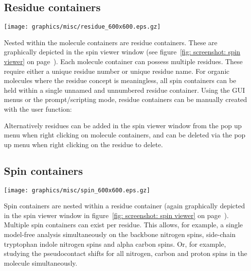 \subsection{Residue containers}

\begin{figure*}[h]
\texttt{[image: graphics/misc/residue\_600x600.eps.gz]}
\end{figure*}

Nested within the molecule containers are residue containers.  These are graphically depicted in the spin viewer window (see figure~\ref{fig: screenshot: spin viewer} on page~\pageref{fig: screenshot: spin viewer}).  Each molecule container can possess multiple residues.  These require either a unique residue number or unique residue name.  For organic molecules where the residue concept is meaningless, all spin containers can be held within a single unnamed and unnumbered residue container.  Using the GUI menus or the prompt/scripting mode, residue containers can be manually created with the user function:


Alternatively residues can be added in the spin viewer window from the pop up menu when right clicking on molecule containers, and can be deleted via the pop up menu when right clicking on the residue to delete.




\newpage
\subsection{Spin containers}

\begin{figure*}[h]
\texttt{[image: graphics/misc/spin\_600x600.eps.gz]}
\end{figure*}

Spin containers are nested within a residue container (again graphically depicted in the spin viewer window in figure~\ref{fig: screenshot: spin viewer} on page~\pageref{fig: screenshot: spin viewer}).  Multiple spin containers can exist per residue.  This allows, for example, a single model-free analysis simultaneously on the backbone nitrogen spins, side-chain tryptophan indole nitrogen spins and alpha carbon spins.  Or, for example, studying the pseudocontact shifts for all nitrogen, carbon and proton spins in the molecule simultaneously.

